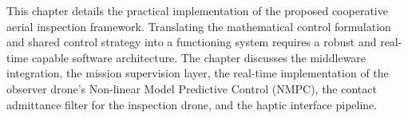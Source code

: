 

This chapter details the practical implementation of the proposed cooperative aerial inspection framework. Translating the mathematical control formulation and shared control strategy into a functioning system requires a robust and real-time capable software architecture. The chapter discusses the middleware integration, the mission supervision layer, the real-time implementation of the observer drone's Non-linear Model Predictive Control (NMPC), the contact admittance filter for the inspection drone, and the haptic interface pipeline.
